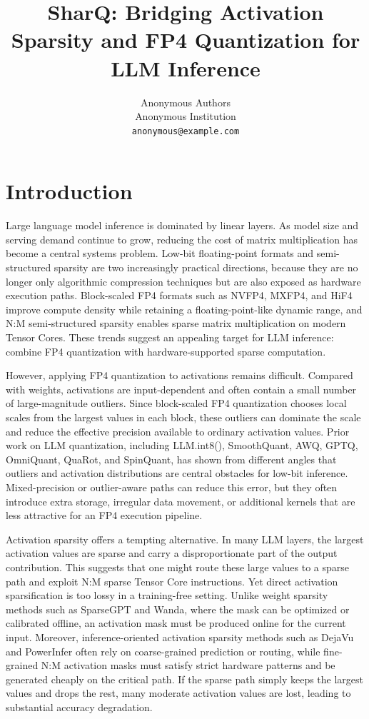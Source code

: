 \documentclass{article}
\title{SharQ: Bridging Activation Sparsity and FP4 Quantization for LLM Inference}
\author{%
  Anonymous Authors \\
  Anonymous Institution \\
  \texttt{anonymous@example.com} \\
}
\begin{document}
\maketitle

\begin{abstract}
\end{abstract}

\section{Introduction}

Large language model inference is dominated by linear layers. As model size and
serving demand continue to grow, reducing the cost of matrix multiplication has
become a central systems problem. Low-bit floating-point formats and
semi-structured sparsity are two increasingly practical directions, because they
are no longer only algorithmic compression techniques but are also exposed as
hardware execution paths. Block-scaled FP4 formats such as NVFP4, MXFP4, and
HiF4 improve compute density while retaining a floating-point-like dynamic
range, and N:M semi-structured sparsity enables sparse matrix multiplication on
modern Tensor Cores. These trends suggest an appealing target for LLM inference:
combine FP4 quantization with hardware-supported sparse computation.

However, applying FP4 quantization to activations remains difficult. Compared
with weights, activations are input-dependent and often contain a small number of
large-magnitude outliers. Since block-scaled FP4 quantization chooses local
scales from the largest values in each block, these outliers can dominate the
scale and reduce the effective precision available to ordinary activation
values. Prior work on LLM quantization, including LLM.int8(), SmoothQuant, AWQ,
GPTQ, OmniQuant, QuaRot, and SpinQuant, has shown from different angles that
outliers and activation distributions are central obstacles for low-bit
inference. Mixed-precision or outlier-aware paths can reduce this error, but
they often introduce extra storage, irregular data movement, or additional
kernels that are less attractive for an FP4 execution pipeline.

Activation sparsity offers a tempting alternative. In many LLM layers, the
largest activation values are sparse and carry a disproportionate part of the
output contribution. This suggests that one might route these large values to a
sparse path and exploit N:M sparse Tensor Core instructions. Yet direct
activation sparsification is too lossy in a training-free setting. Unlike weight
sparsity methods such as SparseGPT and Wanda, where the mask can be optimized or
calibrated offline, an activation mask must be produced online for the current
input. Moreover, inference-oriented activation sparsity methods such as DejaVu
and PowerInfer often rely on coarse-grained prediction or routing, while
fine-grained N:M activation masks must satisfy strict hardware patterns and be
generated cheaply on the critical path. If the sparse path simply keeps the
largest values and drops the rest, many moderate activation values are lost,
leading to substantial accuracy degradation.
\end{document}
